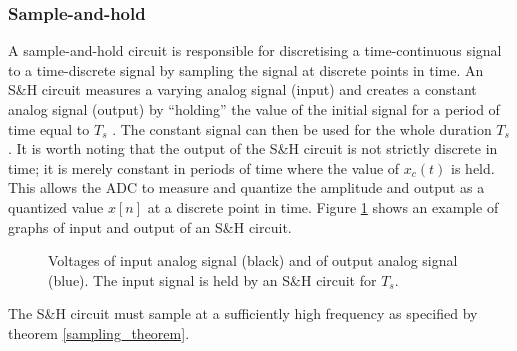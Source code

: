\subsubsection{Sample-and-hold}
A sample-and-hold circuit is responsible for discretising a time-continuous signal to a time-discrete signal by sampling the signal at discrete points in time. An S\&H circuit measures a varying analog signal (input) and creates a constant analog signal (output) by ``holding'' the value of the initial signal for a period of time equal to $T_s$ \cite{page 57, pelgrom}. The constant signal can then be used for the whole duration $T_s$. It is worth noting that the output of the S\&H circuit is not strictly discrete in time; it is merely constant in periods of time where the value of $x_c(t)$ is held. This allows the ADC to measure and quantize the amplitude and output as a quantized value $x[n]$ at a discrete point in time. Figure \ref{fig:S/H} shows an example of graphs of input and output of an S\&H circuit.
\begin{figure}[H]
\centering
{}
\caption{Voltages of input analog signal (black) and of output analog signal (blue). The input signal is held by an S\&H circuit for $T_s$.}
\label{fig:S/H}
\end{figure}
The S\&H circuit must sample at a sufficiently high frequency as specified by theorem \ref{sampling_theorem}.

